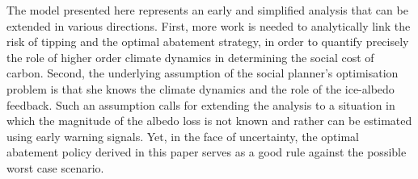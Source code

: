 \documentclass[american, abstract=off]{scrartcl}
\begin{document}
The model presented here represents an early and simplified analysis that can be extended in various directions. First, more work is needed to analytically link the risk of tipping and the optimal abatement strategy, in order to quantify precisely the role of higher order climate dynamics in determining the social cost of carbon. Second, the underlying assumption of the social planner's optimisation problem is that she knows the climate dynamics and the role of the ice-albedo feedback. Such an assumption calls for extending the analysis to a situation in which the magnitude of the albedo loss is not known and rather can be estimated using early warning signals. Yet, in the face of uncertainty, the optimal abatement policy derived in this paper serves as a good rule against the possible worst case scenario.

\newpage
\ifdraft{}{\printbibliography}

\newpage\appendix

\end{document}
